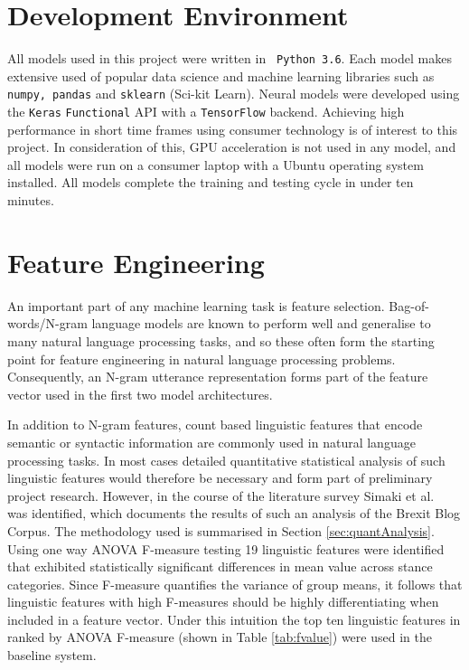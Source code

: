 \documentclass[Dissertation.tex]{subfiles}
\begin{document}
\section{Development Environment}
All models used in this project were written in \texttt{ Python 3.6}. Each model makes extensive used of popular data science and machine learning libraries such as \texttt{numpy, pandas} and \texttt{sklearn} (Sci-kit Learn). Neural models were developed using the \texttt{Keras} \texttt{Functional} API with a \texttt{TensorFlow} backend. Achieving high performance in short time frames using consumer technology is of interest to this project. In consideration of this, GPU acceleration is not used in any model, and all models were run on a consumer laptop with a Ubuntu operating system installed. All models complete the training and testing cycle in under ten minutes.

\section{Feature Engineering} \label{sec:featEngin}
An important part of any machine learning task is feature selection. Bag-of-words/N-gram language models are known to perform well and generalise to many natural language processing tasks, and so these often form the starting point for feature engineering in natural language processing problems.  Consequently, an N-gram utterance representation forms part of the feature vector used in the first two model architectures.

In addition to N-gram features, count based linguistic features that encode semantic or syntactic information are commonly used in natural language processing tasks. In most cases detailed quantitative statistical analysis of such linguistic features would therefore be necessary  and form part of preliminary project research. However, in the course of the literature survey Simaki et al.\ \cite{simakiEvaluatingStanceannotatedSentences2018} was identified, which documents the results of such an analysis of the Brexit Blog Corpus. The methodology used is summarised in Section \ref{sec:quantAnalysis}.
Using one way ANOVA F-measure testing 19 linguistic features were identified that exhibited statistically significant differences in mean value across stance categories.  Since F-measure quantifies the variance of group means, it follows that linguistic features with high F-measures should be highly differentiating when included in a feature vector. Under this intuition the top ten linguistic features in \cite{simakiDetectionStanceRelatedCharacteristics2018} ranked by ANOVA F-measure (shown in Table \ref{tab:fvalue}) were used in the baseline system.
\end{document}
